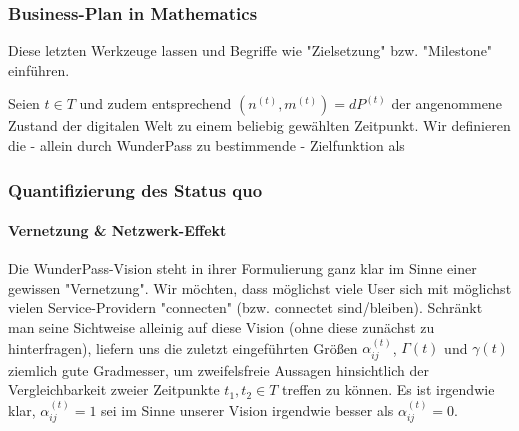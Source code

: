 \vspace{1cm}

















\vspace{1cm}


\subsubsection{Business-Plan in Mathematics}
\label{sec:eco_zahlen_business_plan}

Diese letzten Werkzeuge lassen und Begriffe wie "Zielsetzung" bzw. "Milestone" einführen.

\vspace{0.3cm}

\begin{Def}\label{defZiel}

Seien $t \in T$ und zudem entsprechend $(n^{(t)}, m^{(t)}) = dP^{(t)}$ der angenommene Zustand der digitalen Welt zu einem beliebig gewählten Zeitpunkt. Wir definieren die - allein durch WunderPass zu bestimmende - Zielfunktion als

\end{Def}


\subsubsection{Quantifizierung des Status quo}
\label{sec:eco_zahlen_status_quo}



\paragraph{Vernetzung \& Netzwerk-Effekt}
\label{sec:zahlen_status_quo_netzwerk_effekt}

\textrm{ }
\vspace{0.3cm}

Die WunderPass-Vision steht in ihrer Formulierung ganz klar im Sinne einer gewissen "Vernetzung". Wir möchten, dass möglichst viele User sich mit möglichst vielen Service-Providern "connecten" (bzw. connectet sind/bleiben). Schränkt man seine Sichtweise alleinig auf diese Vision (ohne diese zunächst zu hinterfragen), liefern uns die zuletzt eingeführten Größen $\alpha^{(t)}_{ij}$, $\Gamma(t)$ und $\gamma(t)$ ziemlich gute Gradmesser, um zweifelsfreie Aussagen hinsichtlich der Vergleichbarkeit zweier Zeitpunkte $t_1, t_2 \in T$ treffen zu können. Es ist irgendwie klar, $\alpha^{(t)}_{ij} = 1$ sei im Sinne unserer Vision irgendwie besser als $\alpha^{(t)}_{ij} = 0$.

